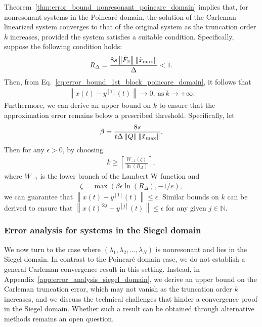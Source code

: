 \documentclass[superscriptaddress,onecolumn,nofootinbib,longbibliography,a4paper,accepted=2026-09-29]{quantumarticle}
\theoremstyle{plain}
\theoremstyle{definition}
\numberwithin{thm}{section}
\numberwithin{assumption}{section}
\numberwithin{lemma}{section}
\numberwithin{prop}{section}
\numberwithin{cor}{section}
\numberwithin{definition}{section}
\numberwithin{rmk}{section}
\numberwithin{equation}{section}
\newcommand{\norm}[1]     {\left\| #1 \right\|}
\newcommand{\myN}{\mathbb{N}}
\newcommand{\lrb}[1]{\left ( #1 \right )}
\newcommand{\myln}[1]{\operatorname{ln} \lrb{#1}}
\begin{document}
Theorem~\ref{thm:error_bound_nonresonant_poincare_domain} implies that, for nonresonant systems in the Poincaré domain, the solution of the Carleman linearized system converges to that of the original system as the truncation order $k$ increases, provided the system satisfies a suitable condition. 
Specifically, suppose the following condition holds:
\begin{align}
R_\Delta = \frac{8 s  \norm{\tilde{F}_2} \norm{\tilde{x}_{\rm max}}}{\Delta} < 1.
\end{align}
Then, from Eq.~\eqref{eq:error_bound_1st_block_poincare_domain}, it follows that 
\begin{align}
    \norm{x(t) - y^{[1]}(t)} \to 0, ~\textrm{as}~k \to +\infty.
\end{align}
Furthermore, we can derive an upper bound on $k$ to ensure that the approximation error remains below a prescribed threshold. Specifically, let 
\begin{align}
\beta = \frac{8s}{t\Delta \norm{Q} \norm{\tilde{x}_{\rm max}}}.
\end{align}
Then for any $\epsilon > 0$, by choosing  
\begin{align}
k \ge \left \lceil \frac{W_{-1}(\zeta)}{\myln{R_\Delta}} \right \rceil,
\end{align}
where $W_{-1}$ is the lower branch of the Lambert W function and 
\begin{align}
\zeta=\max(\beta\epsilon \myln{R_\Delta}, -1/e),    
\end{align}
we can guarantee that $\norm{x(t) - y^{[1]}(t)} \le \epsilon$. Similar bounds on $k$ can be derived to ensure that $ \norm{x(t)^{\otimes j} - y^{[j]}(t)} \le \epsilon$ for any given $j \in \myN$.


\subsubsection{Error analysis for systems in the Siegel domain}
\label{subsubsec:error_analysis_siegel_domain}

We now turn to the case where $(\lambda_1, \lambda_2, \dots, \lambda_N)$ is nonresonant and lies in the Siegel domain. In contrast to the Poincar\'{e} domain case, we do not establish a general Carleman convergence result in this setting. Instead, in Appendix~\ref{app:error_analysis_siegel_domain}, we derive an upper bound on the Carleman truncation error,  which may not vanish as the truncation order $k$ increases, and we discuss the technical challenges that hinder a convergence proof in the Siegel domain. Whether such a result can be obtained through alternative methods remains an open question.
\end{document}
